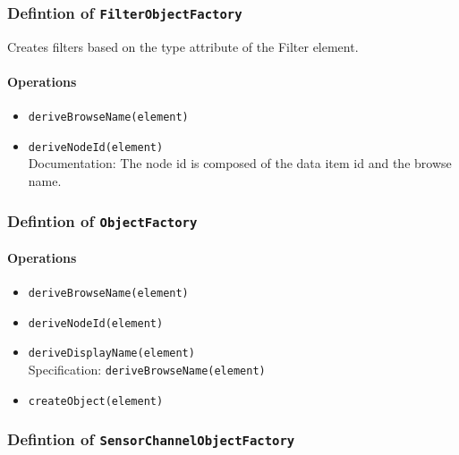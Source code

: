 \subsubsection{Defintion of \texttt{FilterObjectFactory}} \label{type:FilterObjectFactory}

\FloatBarrier

Creates filters based on the type attribute of the Filter element. 

\paragraph{Operations}
\begin{itemize}
  \item \texttt{deriveBrowseName(element)}
  \item \texttt{deriveNodeId(element)}\\
    Documentation: The node id is composed of the data item id and the browse name.

\end{itemize}
\subsubsection{Defintion of \texttt{ObjectFactory}} \label{type:ObjectFactory}

\FloatBarrier



\paragraph{Operations}
\begin{itemize}
  \item \texttt{deriveBrowseName(element)}
  \item \texttt{deriveNodeId(element)}
  \item \texttt{deriveDisplayName(element)}\\
    Specification: \texttt{deriveBrowseName(element)}

  \item \texttt{createObject(element)}
\end{itemize}
\subsubsection{Defintion of \texttt{SensorChannelObjectFactory}} \label{type:SensorChannelObjectFactory}

\FloatBarrier



